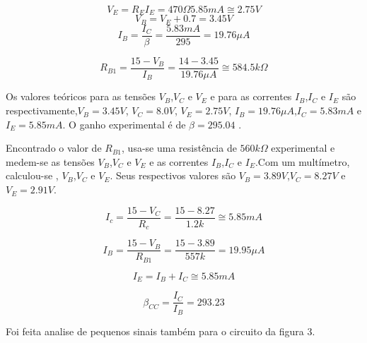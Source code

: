 \documentclass[a4paper]{article} %
\begin{document}
\begin{displaymath}
V_E=R_EI_E=470\Omega 5.85mA \cong 2.75V
\end{displaymath}
\begin{displaymath}
V_B=V_E+0.7=3.45V
\end{displaymath}
\begin{displaymath}
I_B=\frac{I_C}{\beta}=\frac{5.83mA}{295}=19.76\mu A
\end{displaymath}



\begin{displaymath}
R_{B1}=\frac{15-V_B}{I_B}=\frac{14-3.45}{19.76\mu A} \cong 584.5k\Omega 
\end{displaymath}


Os valores teóricos para as tensões $V_B$,$V_C$ e $V_E$ e para as correntes $I_B$,$I_C$ e $I_E$
são respectivamente,$V_B=3.45V$, $V_C=8.0V$, $V_E=2.75V$, $I_B=19.76 \mu A$,$I_C=5.83mA$ e $I_E=5.85mA$.
O ganho experimental é de $\beta =295.04$ . 


Encontrado o valor de $R_{B1}$, usa-se uma resistência de $560k\Omega$
experimental e medem-se as tensões $V_B$,$V_C$ e $V_E$  e as correntes $I_B$,$I_C$ e $I_E$.Com um
multímetro, calculou-se , $V_B$,$V_C$ e $V_E$. Seus respectivos valores são $V_B=3.89V$,$V_C=8.27V$
e $V_E=2.91V$.




\begin{displaymath}
I_c=\frac{15-V_C}{R_c}=\frac{15-8.27}{1.2k}\cong5.85mA
\end{displaymath}


\begin{displaymath}
I_B=\frac{15-V_B}{R_{B1}}=\frac{15-3.89}{557k}=19.95\mu A
\end{displaymath}


\begin{displaymath}
I_E=I_B+I_C \cong 5.85mA
\end{displaymath}

\begin{displaymath}
\beta_{CC}=\frac{I_C}{I_B}=293.23
\end{displaymath}


Foi feita analise de pequenos sinais também para o circuito da figura 3.
\end{document}

